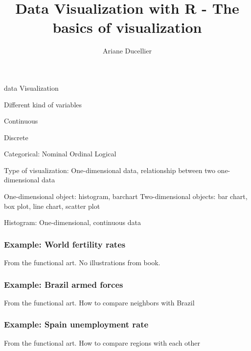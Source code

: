 \documentclass{beamer}
\title[The basics of visualization]{Data Visualization with R - The basics of visualization}
\author{Ariane Ducellier}
\begin{document}
	\begin{frame}
		\titlepage
	\end{frame}

	\begin{frame}


data Visualization

Different kind of variables

Continuous

Discrete

Categorical: Nominal
                    Ordinal
                    Logical
                    
Type of visualization: One-dimensional data, relationship between two one-dimensional data
          
One-dimensional object: histogram, barchart
Two-dimensional objects: bar chart, box plot, line chart, scatter plot

Histogram: One-dimensional, continuous data

	\end{frame}

	\begin{frame}
		\frametitle{Example: World fertility rates}

		From the functional art.
		No illustrations from book.
	\end{frame}

	\begin{frame}
		\frametitle{Example: Brazil armed forces}

		From the functional art.
		How to compare neighbors with Brazil

	\end{frame}

	\begin{frame}
		\frametitle{Example: Spain unemployment rate}

		From the functional art.
		How to compare regions with each other

	\end{frame}
	
\end{document}
